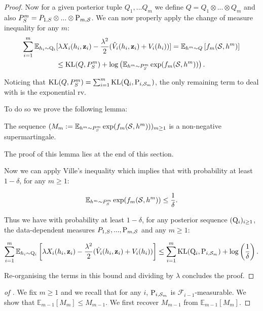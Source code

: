 \begin{noaddcontents}
\begin{proof}
   Now for a given posterior tuple $Q_1,...Q_m$ we define $Q= Q_1 \otimes ...\otimes Q_m$ and also $P^m_S = P_{1,S}\otimes...\otimes \P_{m,\S}$. We can now properly apply the change of measure inequality for any $m$:
   \begin{multline*}
    \sum_{i=1}^m \mathbb{E}_{h_i\sim \Q_{i}}[\lambda X_i(h_i,\z_i)  - \frac{\lambda^2}{2}(\hat{V}_i(h_i,\z_i) + V_i(h_i))]  = \mathbb{E}_{h^m\sim Q}\left[ f_m(\S,h^m) \right] \\
     \leq \operatorname{KL}(Q,P^m_S) + \log \left( \mathbb{E}_{h^m\sim P^m_S}\exp(f_m(\S,h^m))  \right).
   \end{multline*}
 
   Noticing that $\operatorname{KL}(Q,P^m_S)= \sum_{i=1}^m \operatorname{KL}(\Q_{i},\P_{i,\Sm})$, the only remaining term to deal with is the exponential rv.

   To do so we prove the following lemma:

   \begin{lemma}
    \label{l: nonneg_supmart}
     The sequence $(M_m:=\mathbb{E}_{h^m\sim P^m_S}\exp(f_m(\S,h^m)))_{m\geq 1}$ is a non-negative supermartingale.
   \end{lemma}
   The proof of this lemma lies at the end of this section.

 Now we can apply Ville's inequality which implies that with probability at least $1-\delta$, for any $m\geq 1$:

 \[ \mathbb{E}_{h^m\sim P^m_S}\exp(f_m(\S,h^m)) \leq \frac{1}{\delta}. \]

 Thus we have with probability at least $1-\delta$, for any posterior sequence $(\Q_{i})_{i\geq 1}$, the data-dependent measures $P_{1,S},...,\P_{m,\S}$ and any $m\geq 1$:

 \begin{align*}
  \sum_{i=1}^m \mathbb{E}_{h_i\sim \Q_{i}}\left[\lambda X_i(h_i,\z_i)  - \frac{\lambda^2}{2}(\hat{V}_i(h_i,\z_i) + V_i(h_i))\right] \leq \sum_{i=1}^m \operatorname{KL}(\Q_{i},\P_{i,\Sm}) + \log \left( \frac{1}{\delta}  \right).
 \end{align*}

 Re-organising the terms in this bound and dividing by $\lambda$ concludes the proof.

 \end{proof}

 \begin{proof}[of ]
  We fix $m\geq 1$ and we recall that for any $i$, $\P_{i,\Sm}$ is $\mathcal{F}_{i-1}$-measurable. We show that $\mathbb{E}_{m-1}[M_m] \leq M_{m-1}$. We first recover $M_{m-1}$ from $\mathbb{E}_{m-1}[M_m]$.


\end{proof}
\end{noaddcontents}
